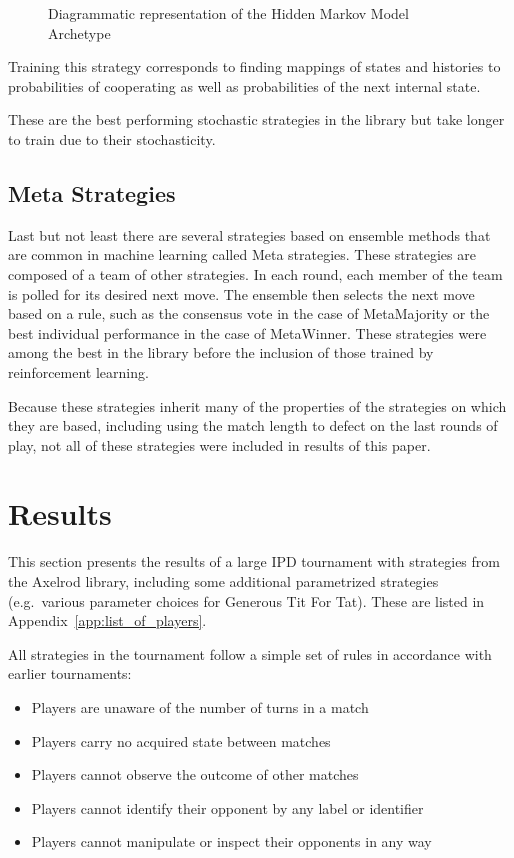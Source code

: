\documentclass{article}
\begin{document}
\begin{figure}[!hbtp]
    \centering
    
    \caption{Diagrammatic representation of the Hidden Markov Model Archetype}
    \label{fig:hmm}
\end{figure}

Training this strategy corresponds to finding mappings of states and histories
to probabilities of cooperating as well as probabilities of the next internal
state.

These are the best performing stochastic strategies
in the library but take longer to train due to their stochasticity.

\subsection{Meta Strategies}

Last but not least there are several strategies based on ensemble methods that
are common in machine learning called Meta strategies. These strategies are
composed of a team of other strategies. In each round, each member of the team
is polled for its desired next
move. The ensemble then selects the next move based on a rule, such as the
consensus vote in the case of MetaMajority or the best individual performance
in the case of MetaWinner. These strategies were among the best in the library
before the inclusion of those trained by reinforcement learning.

Because these strategies inherit many of the properties of the strategies
on which they are based, including using the match length to defect on the last
rounds of play, not all of these strategies were included in results of this
paper.

\section{Results}\label{sec:results}

This section presents the results of a large IPD tournament with
strategies from the Axelrod library, including some additional parametrized
strategies (e.g.\ various parameter choices for Generous Tit For Tat). These are
listed in Appendix~\ref{app:list_of_players}.

All strategies in the tournament follow a simple set of
rules in accordance with earlier tournaments:

\begin{itemize}
  \item Players are unaware of the number of turns in a match
  \item Players carry no acquired state between matches
  \item Players cannot observe the outcome of other matches
  \item Players cannot identify their opponent by any label or identifier
  \item Players cannot manipulate or inspect their opponents in any way
\end{itemize}
\end{document}
